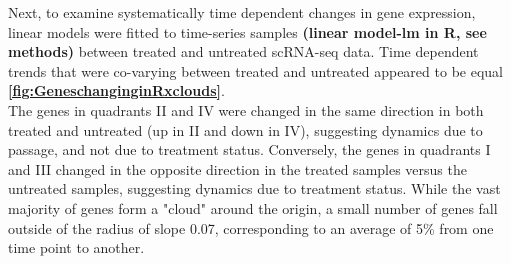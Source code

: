 Next, to examine systematically time dependent changes in gene expression, linear models were fitted to time-series samples \textbf{(linear model-lm in R, see methods)} between treated and untreated scRNA-seq data. 
Time dependent trends that were co-varying between treated and untreated appeared to be equal \textbf{\autoref{fig:GeneschanginginRxclouds}}. 
\\
The genes in quadrants II and IV were changed in the same direction in both treated and untreated (up in II and down in IV), suggesting dynamics due to passage, and not due to treatment status. Conversely, the genes in quadrants I and III changed in the opposite direction in the treated samples versus the untreated samples, suggesting dynamics due to treatment status. While the vast majority of genes form a "cloud" around the origin, a small number of genes fall outside of the radius of slope 0.07, corresponding to an average of 5\% from one time point to another. 

